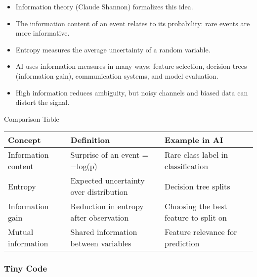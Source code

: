 \documentclass[
  letterpaper,
  DIV=11,
  numbers=noendperiod]{scrreprt}
\providecommand{\tightlist}{%
  \setlength{\itemsep}{0pt}\setlength{\parskip}{0pt}}
\begin{document}
\begin{itemize}
\tightlist
\item
  Information theory (Claude Shannon) formalizes this idea.
\item
  The information content of an event relates to its probability: rare
  events are more informative.
\item
  Entropy measures the average uncertainty of a random variable.
\item
  AI uses information measures in many ways: feature selection, decision
  trees (information gain), communication systems, and model evaluation.
\item
  High information reduces ambiguity, but noisy channels and biased data
  can distort the signal.
\end{itemize}

Comparison Table

\begin{longtable}[]{@{}
  >{\raggedright\arraybackslash}p{}
  >{\raggedright\arraybackslash}p{}
  >{\raggedright\arraybackslash}p{}@{}}
\toprule\noalign{}
\begin{minipage}[b]{\linewidth}\raggedright
Concept
\end{minipage} & \begin{minipage}[b]{\linewidth}\raggedright
Definition
\end{minipage} & \begin{minipage}[b]{\linewidth}\raggedright
Example in AI
\end{minipage} \\
\midrule\noalign{}
\endhead
\bottomrule\noalign{}
\endlastfoot
Information content & Surprise of an event = −log(p) & Rare class label
in classification \\
Entropy & Expected uncertainty over distribution & Decision tree
splits \\
Information gain & Reduction in entropy after observation & Choosing the
best feature to split on \\
Mutual information & Shared information between variables & Feature
relevance for prediction \\
\end{longtable}

\subsubsection{Tiny Code}\label{tiny-code-20}
\end{document}
